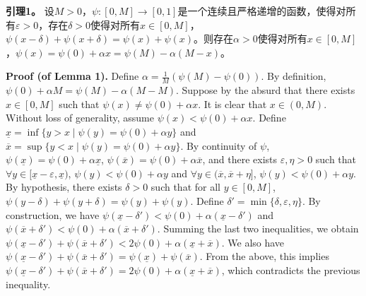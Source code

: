 \documentclass[12pt,a4paper]{article}
\newenvironment{original}
  {\par\noindent\ignorespaces}
  {\par}
\newenvironment{translation}
  {\par\noindent{\color{transblue}\ignorespaces}}
  {\par\medskip}
\begin{document}
\begin{translation}
\textbf{引理1。} 设$M > 0$，$\psi: [0, M] \to [0, 1]$是一个连续且严格递增的函数，使得对所有$\varepsilon > 0$，存在$\delta > 0$使得对所有$x \in [0, M]$，$\psi(x - \delta) + \psi(x + \delta) = \psi(x) + \psi(x)$。则存在$\alpha > 0$使得对所有$x \in [0, M]$，$\psi(x) = \psi(0) + \alpha x = \psi(M) - \alpha(M - x)$。
\end{translation}

\begin{original}
\textbf{Proof (of Lemma 1).} Define $\alpha = \frac{1}{M}(\psi(M) - \psi(0))$. By definition, $\psi(0) + \alpha M = \psi(M) - \alpha(M - M)$. Suppose by the absurd that there exists $x \in [0, M]$ such that $\psi(x) \neq \psi(0) + \alpha x$. It is clear that $x \in (0, M)$. Without loss of generality, assume $\psi(x) < \psi(0) + \alpha x$. Define $\underline{x} = \inf\{y > x \mid \psi(y) = \psi(0) + \alpha y\}$ and $\overline{x} = \sup\{y < x \mid \psi(y) = \psi(0) + \alpha y\}$. By continuity of $\psi$, $\psi(\underline{x}) = \psi(0) + \alpha \underline{x}$, $\psi(\overline{x}) = \psi(0) + \alpha \overline{x}$, and there exists $\varepsilon, \eta > 0$ such that $\forall y \in [\underline{x} - \varepsilon, \underline{x})$, $\psi(y) < \psi(0) + \alpha y$ and $\forall y \in (\overline{x}, \overline{x} + \eta]$, $\psi(y) < \psi(0) + \alpha y$. By hypothesis, there exists $\delta > 0$ such that for all $y \in [0, M]$, $\psi(y - \delta) + \psi(y + \delta) = \psi(y) + \psi(y)$. Define $\delta' = \min\{\delta, \varepsilon, \eta\}$. By construction, we have $\psi(\underline{x} - \delta') < \psi(0) + \alpha(\underline{x} - \delta')$ and $\psi(\overline{x} + \delta') < \psi(0) + \alpha(\overline{x} + \delta')$. Summing the last two inequalities, we obtain $\psi(\underline{x} - \delta') + \psi(\overline{x} + \delta') < 2\psi(0) + \alpha(\underline{x} + \overline{x})$. We also have $\psi(\underline{x} - \delta') + \psi(\overline{x} + \delta') = \psi(\underline{x}) + \psi(\overline{x})$. From the above, this implies $\psi(\underline{x} - \delta') + \psi(\overline{x} + \delta') = 2\psi(0) + \alpha(\underline{x} + \overline{x})$, which contradicts the previous inequality.
\end{original}
\end{document}
